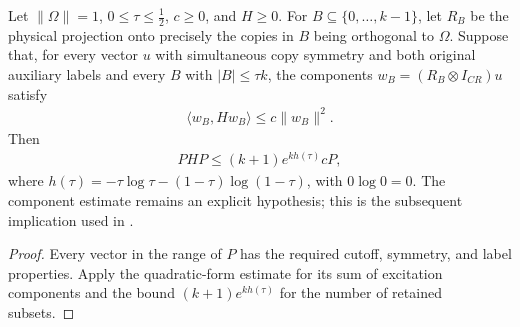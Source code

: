 \begin{theorem}
\label{thm:replica_low_defect_compression_from_components}
\leanok
Let $\|\Omega\|=1$, $0\le\tau\le\tfrac12$, $c\ge0$, and $H\ge0$.
For $B\subseteq\{0,\ldots,k-1\}$, let $R_B$ be the physical projection
onto precisely the copies in $B$ being orthogonal to $\Omega$.
Suppose that, for every vector $u$ with simultaneous copy symmetry
and both original auxiliary labels and every $B$ with $|B|\le\tau k$,
the components $w_B=(R_B\otimes I_{CR})u$ satisfy
\begin{align}
 \langle w_B,Hw_B\rangle\le c\|w_B\|^2.
\end{align}
Then
\begin{align}
 PHP\le(k+1)e^{kh(\tau)}cP,
\end{align}
where $h(\tau)=-\tau\log\tau-(1-\tau)\log(1-\tau)$, with
$0\log0=0$. The component estimate remains an explicit hypothesis;
this is the subsequent implication used in
\cite[Section~8, \textup{(comparator:inverse-compression)}]{OpenAI2026AreaLaw}.
\end{theorem}
\begin{proof}
\leanok
{}
Every vector in the range of $P$ has the required cutoff, symmetry,
and label properties. Apply the quadratic-form estimate for its sum
of excitation components and the bound
$(k+1)e^{kh(\tau)}$ for the number of retained subsets.
\end{proof}
